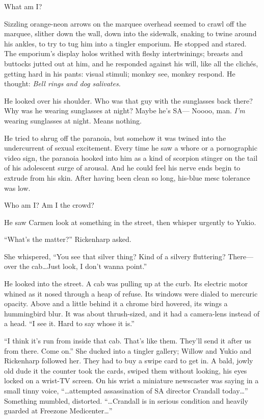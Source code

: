 What am I?

Sizzling orange-neon arrows on the marquee overhead seemed to crawl off the marquee, slither down the wall, down into the sidewalk, snaking to twine around his ankles, to try to tug him into a tingler emporium. He stopped and stared. The emporium's display holos writhed with fleshy intertwinings; breasts and buttocks jutted out at him, and he responded against his will, like all the clichés, getting hard in his pants: visual stimuli; monkey see, monkey respond. He thought: \textit{Bell rings and dog salivates.}

He looked over his shoulder. Who was that guy with the sunglasses back there? Why was he wearing sunglasses at night? Maybe he's SA--- Noooo, man. \textit{I'm} wearing sunglasses at night. Means nothing.

He tried to shrug off the paranoia, but somehow it was twined into the undercurrent of sexual excitement. Every time he saw a whore or a pornographic video sign, the paranoia hooked into him as a kind of scorpion stinger on the tail of his adolescent surge of arousal. And he could feel his nerve ends begin to extrude from his skin. After having been clean so long, his-blue mesc tolerance was low.

Who am I? Am I the crowd?

He saw Carmen look at something in the street, then whisper urgently to Yukio.

``What's the matter?'' Rickenharp asked.

She whispered, ``You see that silver thing? Kind of a silvery fluttering? There---over the cab\ldots Just look, I don't wanna point.''

He looked into the street. A cab was pulling up at the curb. Its electric motor whined as it nosed through a heap of refuse. Its windows were dialed to mercuric opacity. Above and a little behind it a chrome bird hovered, its wings a hummingbird blur. It was about thrush-sized, and it had a camera-lens instead of a head. ``I see it. Hard to say whose it is.''

``I think it's run from inside that cab. That's like them. They'll send it after us from there. Come on.'' She ducked into a tingler gallery; Willow and Yukio and Rickenharp followed her. They had to buy a swipe card to get in. A bald, jowly old dude it the counter took the cards, swiped them without looking, his eyes locked on a wrist-TV screen. On his wrist a miniature newscaster was saying in a small tinny voice, ``\ldots attempted assassination of SA director Crandall today\ldots '' Something mumbled, distorted. ``\ldots Crandall is in serious condition and heavily guarded at Freezone Medicenter\ldots ''

